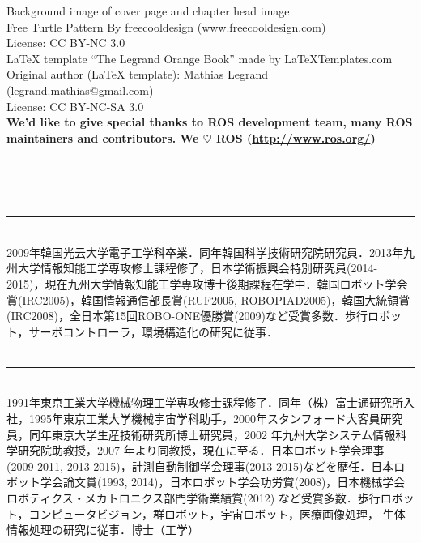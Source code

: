 \documentclass[11pt,fleqn]{book} %
\begin{document}
\noindent Background image of cover page and chapter head image\\
Free Turtle Pattern By freecooldesign (www.freecooldesign.com)\\
License: CC BY-NC 3.0\\

\noindent LaTeX template ``The Legrand Orange Book'' made by LaTeXTemplates.com\\
Original author (LaTeX template): Mathias Legrand (legrand.mathias@gmail.com)\\
License: CC BY-NC-SA 3.0\\

\noindent \textbf{We'd like to give special thanks to ROS development team, many ROS maintainers and contributors. We $\heartsuit$ ROS (\url{http://www.ros.org/})}

\newpage
\linespread{1.3}
\thispagestyle{empty}

\noindent{\LARGE [著者プロフィール]}\\
\\
\\
\noindent\rule{7cm}{1pt}\\
\normalsize
2009年韓国光云大学電子工学科卒業．同年韓国科学技術研究院研究員．2013年九州大学情報知能工学専攻修士課程修了，日本学術振興会特別研究員(2014-2015)，現在九州大学情報知能工学専攻博士後期課程在学中．韓国ロボット学会賞(IRC2005)，韓国情報通信部長賞(RUF2005, ROBOPIAD2005)，韓国大統領賞(IRC2008)，全日本第15回ROBO-ONE優勝賞(2009)など受賞多数．歩行ロボット，サーボコントローラ，環境構造化の研究に従事．\\

\\
\noindent\rule{7cm}{1pt}\\
\normalsize
1991年東京工業大学機械物理工学専攻修士課程修了．同年（株）富士通研究所入社，1995年東京工業大学機械宇宙学科助手，2000年スタンフォード大客員研究員，同年東京大学生産技術研究所博士研究員，2002 年九州大学システム情報科学研究院助教授，2007 年より同教授，現在に至る．日本ロボット学会理事(2009-2011, 2013-2015)，計測自動制御学会理事(2013-2015)などを歴任．日本ロボット学会論文賞(1993, 2014)，日本ロボット学会功労賞(2008)，日本機械学会ロボティクス・メカトロニクス部門学術業績賞(2012) など受賞多数．歩行ロボット，コンピュータビジョン，群ロボット，宇宙ロボット，医療画像処理， 生体情報処理の研究に従事．博士（工学）\\
\end{document}
